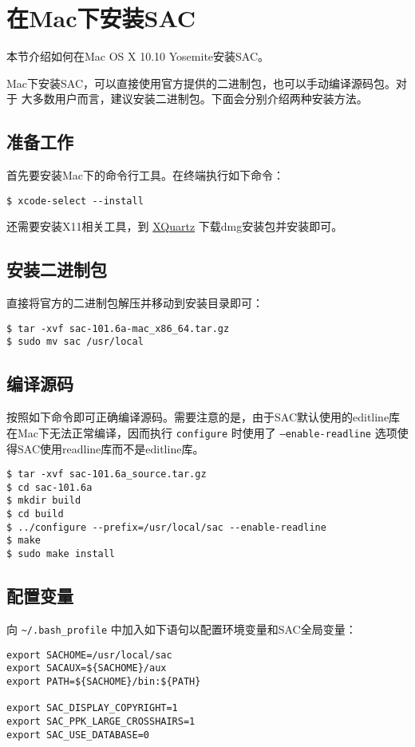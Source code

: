 \section{在Mac下安装SAC}
\label{sec:sac-install-for-mac}
本节介绍如何在Mac OS X 10.10 Yosemite安装SAC。

Mac下安装SAC，可以直接使用官方提供的二进制包，也可以手动编译源码包。对于
大多数用户而言，建议安装二进制包。下面会分别介绍两种安装方法。

\subsection{准备工作}
首先要安装Mac下的命令行工具。在终端执行如下命令：
\begin{verbatim}
$ xcode-select --install
\end{verbatim}
还需要安装X11相关工具，到 \href{http://xquartz.macosforge.org/landing/}{XQuartz}
下载dmg安装包并安装即可。

\subsection{安装二进制包}
直接将官方的二进制包解压并移动到安装目录即可：
\begin{verbatim}
$ tar -xvf sac-101.6a-mac_x86_64.tar.gz
$ sudo mv sac /usr/local
\end{verbatim}

\subsection{编译源码}
按照如下命令即可正确编译源码。需要注意的是，由于SAC默认使用的editline库
在Mac下无法正常编译，因而执行 \texttt{configure} 时使用了
\texttt{--enable-readline} 选项使得SAC使用readline库而不是editline库。
\begin{verbatim}
$ tar -xvf sac-101.6a_source.tar.gz
$ cd sac-101.6a
$ mkdir build
$ cd build
$ ../configure --prefix=/usr/local/sac --enable-readline
$ make
$ sudo make install
\end{verbatim}

\subsection{配置变量}
向 \verb|~/.bash_profile| 中加入如下语句以配置环境变量和SAC全局变量：
\begin{verbatim}
export SACHOME=/usr/local/sac
export SACAUX=${SACHOME}/aux
export PATH=${SACHOME}/bin:${PATH}

export SAC_DISPLAY_COPYRIGHT=1
export SAC_PPK_LARGE_CROSSHAIRS=1
export SAC_USE_DATABASE=0
\end{verbatim}

